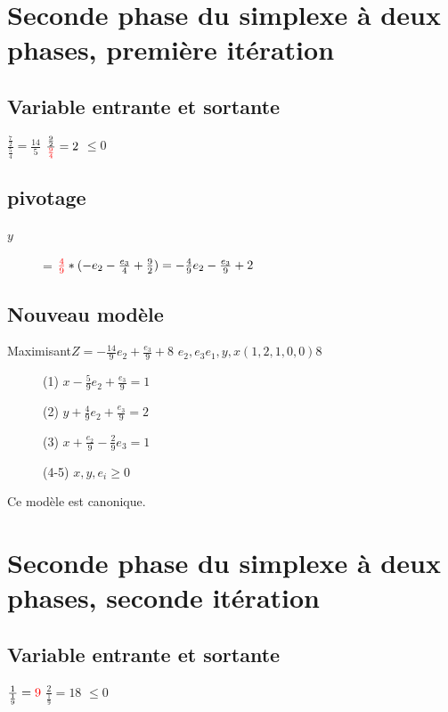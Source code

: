 \section{Seconde phase du simplexe à deux phases, première itération}
\subsection{Variable entrante et sortante}
  {$\frac{\frac{7}{2}}{\frac{5}{4}} = \frac{14}{5}$}
  {$\frac{\frac{9}{2}}{\textcolor{red}{\frac{9}{4}}} = 2$}
  {$ \leqslant 0 $}

\subsection{pivotage}
\begin{description}
\item[$y$] = $\textcolor{red}{\frac{4}{9}}*(- e_2 - \frac{e_3}{4} + \frac{9}{2}) = - \frac{4}{9} e_2 - \frac{e_3}{9} + 2$
\end{description}

\subsection{Nouveau modèle}
        {Maximisant}{$Z = -\frac{14}{9}e_2 + \frac{e_3}{9} + 8$}
        {$e_2,e_3$}{$e_1,y,x$}{$(1,2,1,0,0)$}{$8$}
        {\begin{description}
\item[] (1) $x - \frac{5}{9} e_2 + \frac{e_3}{9} = 1$
\item[] (2) $y + \frac{4}{9} e_2 + \frac{e_3}{9} = 2$
\item[] (3) $x + \frac{e_2}{9} - \frac{2}{9}e_3 = 1$
\item[] (4-5) $x,y,e_i \geqslant 0$
\end{description}
}
Ce modèle est canonique.

\section{Seconde phase du simplexe à deux phases, seconde itération}
\subsection{Variable entrante et sortante}
  {$\frac{1}{\frac{1}{9}} = \textcolor{red}{9}$}
  {$\frac{2}{\frac{1}{9}} = 18$}
  {$ \leqslant 0$}
  
